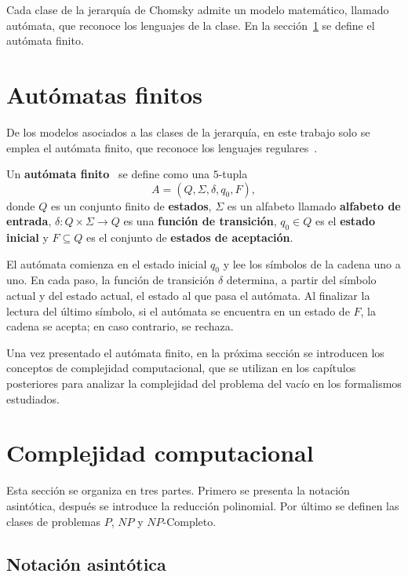 Cada clase de la jerarquía de Chomsky admite un modelo matemático,
llamado autómata, que reconoce los lenguajes de la clase. En la
sección~\ref{sec:automatas} se define el autómata finito.

\section{Autómatas finitos}
\label{sec:automatas}

De los modelos asociados a las clases de la jerarquía, en este trabajo
solo se emplea el autómata finito, que reconoce los lenguajes
regulares~\cite{hopcroft2006introduction}.

\begin{definicion}
Un \textbf{autómata finito}~\cite{hopcroft2006introduction} se define
como una $5$-tupla
\[
  A = (Q, \Sigma, \delta, q_0, F),
\]
donde $Q$ es un conjunto finito de \textbf{estados}, $\Sigma$ es un
alfabeto llamado \textbf{alfabeto de entrada},
$\delta : Q \times \Sigma \to Q$ es una \textbf{función de transición},
$q_0 \in Q$ es el \textbf{estado inicial} y $F \subseteq Q$ es el
conjunto de \textbf{estados de aceptación}.
\end{definicion}

El autómata comienza en el estado inicial $q_0$ y lee los símbolos de la
cadena uno a uno. En cada paso, la función de transición $\delta$
determina, a partir del símbolo actual y del estado actual, el estado al
que pasa el autómata. Al finalizar la lectura del último símbolo, si el
autómata se encuentra en un estado de $F$, la cadena se acepta; en caso
contrario, se rechaza.

Una vez presentado el autómata finito, en la próxima sección se
introducen los conceptos de complejidad computacional, que se utilizan
en los capítulos posteriores para analizar la complejidad del problema
del vacío en los formalismos estudiados.

\section{Complejidad computacional}
\label{sec:complejidad}

Esta sección se organiza en tres partes. Primero se presenta la
notación asintótica, después se introduce la reducción polinomial.
Por último se definen las clases de problemas $P$, $NP$ y
$NP$-Completo.

\subsection{Notación asintótica}


